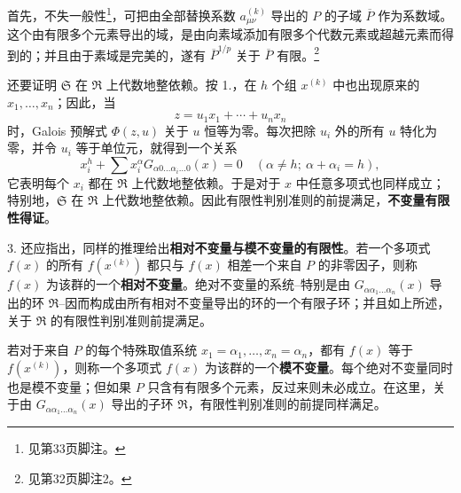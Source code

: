 首先，不失一般性\footnote{见第33页脚注。}，可把由全部替换系数 $a_{\mu\nu}^{(k)}$ 导出的 $P$ 的子域 $\overline P$ 作为系数域。这个由有限多个元素导出的域，是由向素域添加有限多个代数元素或超越元素而得到的；并且由于素域是完美的，遂有 $\overline P^{1/p}$ 关于 $\overline P$ 有限。\footnote{见第32页脚注2。}

还要证明 $\mathfrak S$ 在 $\mathfrak R$ 上代数地整依赖。按 1.，在 $h$ 个组 $x^{(k)}$ 中也出现原来的 $x_1,\ldots,x_n$；因此，当
\[
 z=u_1x_1+\cdots+u_nx_n
\]
时，Galois 预解式 $\Phi(z,u)$ 关于 $u$ 恒等为零。每次把除 $u_i$ 外的所有 $u$ 特化为零，并令 $u_i$ 等于单位元，就得到一个关系
\[
 x_i^h+\sum x_i^\alpha G_{\alpha0\ldots\alpha_i\ldots0}(x)=0
 \quad (\alpha\ne h;\ \alpha+\alpha_i=h),
\]
它表明每个 $x_i$ 都在 $\mathfrak R$ 上代数地整依赖。于是对于 $x$ 中任意多项式也同样成立；特别地，$\mathfrak S$ 在 $\mathfrak R$ 上代数地整依赖。因此有限性判别准则的前提满足，\textbf{不变量有限性得证}。

3. 还应指出，同样的推理给出\textbf{相对不变量与模不变量的有限性}。若一个多项式 $f(x)$ 的所有 $f(x^{(k)})$ 都只与 $f(x)$ 相差一个来自 $P$ 的非零因子，则称 $f(x)$ 为该群的一个\textbf{相对不变量}。绝对不变量的系统--特别是由 $G_{\alpha\alpha_1\ldots\alpha_n}(x)$ 导出的环 $\mathfrak R$--因而构成由所有相对不变量导出的环的一个有限子环；并且如上所述，关于 $\mathfrak R$ 的有限性判别准则前提满足。

若对于来自 $P$ 的每个特殊取值系统 $x_1=\alpha_1,\ldots,x_n=\alpha_n$，都有 $f(x)$ 等于 $f(x^{(k)})$，则称一个多项式 $f(x)$ 为该群的一个\textbf{模不变量}。每个绝对不变量同时也是模不变量；但如果 $P$ 只含有有限多个元素，反过来则未必成立。在这里，关于由 $G_{\alpha\alpha_1\ldots\alpha_n}(x)$ 导出的子环 $\mathfrak R$，有限性判别准则的前提同样满足。

\clearpage

\clearpage
\setcounter{footnote}{0}


